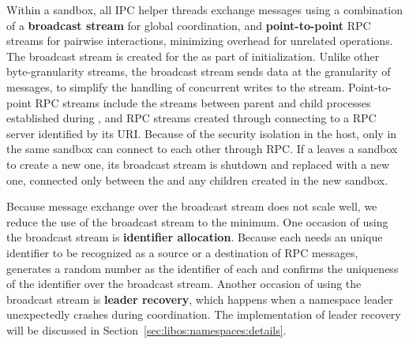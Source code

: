 Within a sandbox, all IPC helper threads exchange messages using a
combination of
a {\bf broadcast stream} for global coordination,
and {\bf point-to-point} RPC streams for pairwise interactions, 
minimizing overhead for unrelated operations.
The broadcast stream is created for the \picoproc{} as part of initialization.
Unlike other byte-granularity streams, the broadcast stream sends data at the granularity of messages,
to simplify the handling of concurrent writes to the stream.
Point-to-point RPC streams include the streams between parent and child processes established during ,
and RPC streams created through connecting to a RPC server
identified by its URI.
Because of the security isolation in the host,
only \picoprocs{} in the same sandbox can connect to each other through RPC.
If a \picoproc{} leaves a sandbox to create a new one,
its broadcast stream is shutdown and replaced
with a new one, connected only between the \picoproc{} and any children created in the
new sandbox.

Because message exchange over the broadcast stream does not scale well,
we reduce the use of the broadcast stream to the minimum.
One occasion of using the broadcast stream is
{\bf \picoproc{} identifier allocation}.
Because each \picoproc{} needs an unique identifier to be recognized as a source or a destination of RPC messages, \thelibos{} generates a random number as the identifier of each \picoproc{} and confirms the uniqueness of the identifier over the broadcast stream.
Another occasion of using the broadcast stream
is {\bf leader recovery}, which happens when a namespace leader unexpectedly crashes
during coordination. The implementation of leader recovery will be discussed in Section~\ref{sec:libos:namespaces:details}.


